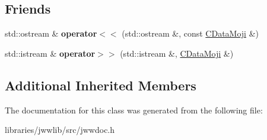 \subsection*{Friends}
\begin{DoxyCompactItemize}
\item 
\hypertarget{classCDataMoji_a5dbd8d2b6cf7d4fcc7267602b8a709bd}{std\-::ostream \& {\bfseries operator$<$$<$} (std\-::ostream \&, const \hyperlink{classCDataMoji}{C\-Data\-Moji} \&)}\label{classCDataMoji_a5dbd8d2b6cf7d4fcc7267602b8a709bd}

\item 
\hypertarget{classCDataMoji_adcec807d125c5e1e2a87aff188ac1394}{std\-::istream \& {\bfseries operator$>$$>$} (std\-::istream \&, \hyperlink{classCDataMoji}{C\-Data\-Moji} \&)}\label{classCDataMoji_adcec807d125c5e1e2a87aff188ac1394}

\end{DoxyCompactItemize}
\subsection*{Additional Inherited Members}


The documentation for this class was generated from the following file\-:\begin{DoxyCompactItemize}
\item 
libraries/jwwlib/src/jwwdoc.\-h\end{DoxyCompactItemize}
